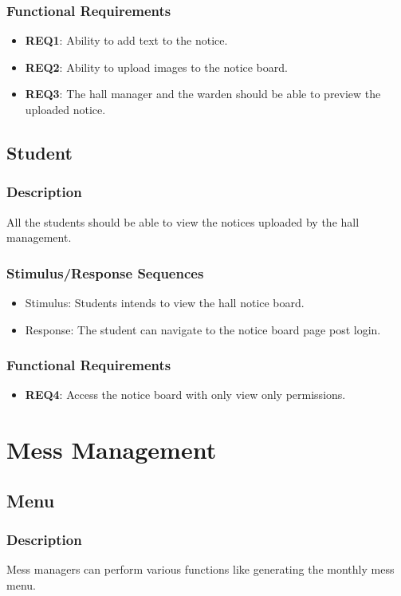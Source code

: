 \documentclass{scrreprt}
\begin{document}
\subsubsection{Functional Requirements}
\begin{itemize}
    \item \textbf{REQ1}: Ability to add text to the notice.
    \item \textbf{REQ2}: Ability to upload images to the notice board.
    \item \textbf{REQ3}: The hall manager and the warden should be able to preview the uploaded notice.
\end{itemize}

\subsection{Student}
\subsubsection{Description}
All the students should be able to view the notices uploaded by the hall management.
\subsubsection{Stimulus/Response Sequences}
\begin{itemize}
    \item Stimulus: Students intends to view the hall notice board.
    \item Response: The student can navigate to the notice board page post login.
\end{itemize}

\subsubsection{Functional Requirements}
\begin{itemize}
    \item \textbf{REQ4}: Access the notice board with only view only permissions.
\end{itemize}

\section{Mess Management}
\subsection{Menu}
\subsubsection{Description}
Mess managers can perform various functions like generating the monthly mess menu.
\end{document}
